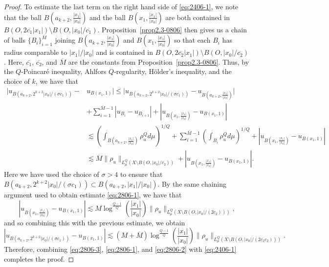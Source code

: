 \documentclass[10pt]{amsart}
\numberwithin{equation}{section}
\begin{document}
\begin{proof}
To estimate the last term on the right hand side of \eqref{eq:2406-1}, we note that the ball $B(a_{k+2},\frac{|x_1|}{|x_0|})$ and the ball $B(x_1,\frac{|x_1|}{|x_0|})$ are both contained in $B(O,2\overline{c_1}|x_1|)\setminus B(O,|x_0|/\overline{c_1})$.  Proposition~\ref{prop2.3-0806} then gives us a chain of balls $\{B_i\}_{i=1}^{\overline{M}}$ joining $B(a_{k+2},\frac{|x_1|}{|x_0|})$ and $B(x_1,\frac{|x_1|}{|x_0|})$ so that each $B_i$ has radius comparable to $|x_1|/|x_0|$ and is contained in $B(O,2\overline{c_2}|x_1|)\setminus B(O,|x_0|/\overline{c_2})$.  Here, $\overline{c_1}$, $\overline{c_2}$, and $\overline M$ are the constants from Proposition~\ref{prop2.3-0806}.  Thus, by the $Q$-Poincar\'e inequality, Ahlfors $Q$-regularity, H\"older's inequality, and the choice of $k$, we have that 
\begin{align*}
    |u_{B(a_{k+2},2^{k+2}|x_0|/(\sigma c_1))}-&u_{B(x_1,1)}|\le|u_{B(a_{k+2},2^{k+2}|x_0|/(\sigma c_1))}-u_{B(a_{k+2},\frac{|x_1|}{|x_0|})}|\\
    &+\sum_{i=1}^{\overline{M}-1}|u_{B_i}-u_{B_{i+1}}|+|u_{B(x_1,\frac{|x_1|}{|x_0|})}-u_{B(x_1,1)}|\\
&\lesssim\left(\int_{B(a_{k+2},\frac{|x_1|}{|x_0|})}\rho_u^Qd\mu\right)^{1/Q}+\sum_{i=1}^{\overline M-1}\left(\int_{B_i}\rho_u^Qd\mu\right)^{1/Q}+|u_{B(x_1,\frac{|x_1|}{|x_0|})}-u_{B(x_1,1)}|\\
&\lesssim \overline M\|\rho_u\|_{L^Q_\mu(X\setminus B(O,|x_0|/\overline{c_2}))}+|u_{B(x_1,\frac{|x_1|}{|x_0|})}-u_{B(x_1,1)}|.
\end{align*}
Here we have used the choice of $\sigma>4$ to ensure that $B(a_{k+2},2^{k+2}|x_0|/(\sigma c_1))\subset B(a_{k+2},|x_1|/|x_0|)$.
By the same chaining argument used to obtain estimate \eqref{eq:2806-1}, we have that 
\[
|u_{B(x_1,\frac{|x_1|}{|x_0|})}-u_{B(x_1,1)}|\lesssim M\log^{\frac{Q-1}{Q}}\left(\frac{|x_1|}{|x_0|}\right)\|\rho_u\|_{L^Q_\mu(X\setminus B(O,|x_0|/(2c_2)))},
\]
and so combining this with the previous estimate, we obtain
\begin{equation}\label{eq:2806-2}
    |u_{B(a_{k+2},2^{k+2}|x_0|/(\sigma c_1))}-u_{B(x_1,1)}|\lesssim(M+\overline M)\log^{\frac{Q-1}{Q}}\left(\frac{|x_1|}{|x_0|}\right)\|\rho_u\|_{L^Q_\mu(X\setminus B(O,|x_0|/(2\overline{c_2}c_2)))}.
\end{equation}
Therefore, combining \eqref{eq:2806-3}, \eqref{eq:2806-1}, and \eqref{eq:2806-2} with \eqref{eq:2406-1} completes the proof.
\end{proof}
\end{document}
